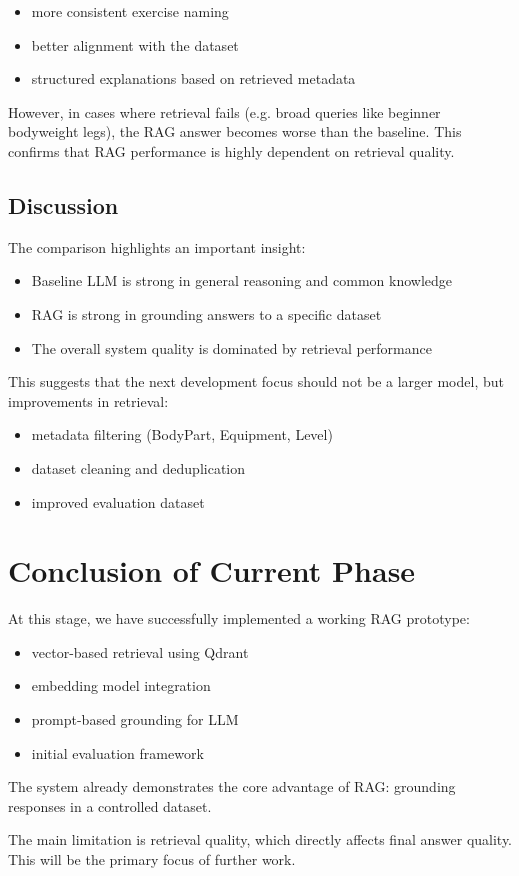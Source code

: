 \documentclass[fleqn,moreauthors,10pt]{ds_report}
\begin{document}
\begin{itemize}
\item more consistent exercise naming
\item better alignment with the dataset
\item structured explanations based on retrieved metadata
\end{itemize}

However, in cases where retrieval fails (e.g. broad queries like beginner bodyweight legs), the RAG answer becomes worse than the baseline. This confirms that RAG performance is highly dependent on retrieval quality.

\subsection*{Discussion}

The comparison highlights an important insight:

\begin{itemize}
\item Baseline LLM is strong in general reasoning and common knowledge
\item RAG is strong in grounding answers to a specific dataset
\item The overall system quality is dominated by retrieval performance
\end{itemize}

This suggests that the next development focus should not be a larger model, but improvements in retrieval:

\begin{itemize}
\item metadata filtering (BodyPart, Equipment, Level)
\item dataset cleaning and deduplication
\item improved evaluation dataset
\end{itemize}

\section*{Conclusion of Current Phase}

At this stage, we have successfully implemented a working RAG prototype:

\begin{itemize}
\item vector-based retrieval using Qdrant
\item embedding model integration
\item prompt-based grounding for LLM
\item initial evaluation framework
\end{itemize}

The system already demonstrates the core advantage of RAG: grounding responses in a controlled dataset.

The main limitation is retrieval quality, which directly affects final answer quality. This will be the primary focus of further work.


\end{document}
